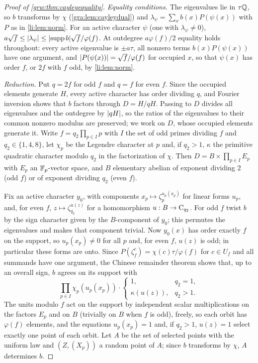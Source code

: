\begin{proof}[Proof of \cref{grw:thm:cayleyequality}]
\emph{Equality conditions.} The eigenvalues lie in $\tau\mathbb{Q}$, so $b$
transforms by $\chi$ (\cref{gra:lem:cayleydual}) and
$\lambda_\psi=\sum_xb(x)P(\psi(x))$ with $P$ as in \cref{li:lem:norm}.
For an active character $\psi$ (one with $\lambda_\psi\ne0$),
$a\sqrt f\le\lvert\lambda_\psi\rvert\le\lvert\operatorname{supp} b\rvert\sqrt f/\varphi(f)$. At
outdegree $a\varphi(f)/2$ equality holds throughout: every active
eigenvalue is $\pm a\tau$, all nonzero terms $b(x)P(\psi(x))$ have one
argument, and $\lvert P(\psi(x))\rvert=\sqrt f/\varphi(f)$ for occupied $x$,
so that $\psi(x)$ has order $f$, or $2f$ with $f$ odd, by
\cref{li:lem:norm}.

\emph{Reduction.} Put $q=2f$ for odd $f$ and $q=f$ for even $f$. Since
the occupied elements generate $H$, every active character has order
dividing $q$, and Fourier inversion shows that $b$ factors through
$D=H/qH$. Passing to $D$ divides all eigenvalues and the outdegree by
$\lvert qH\rvert$, so the ratios of the eigenvalues to their common nonzero
modulus are preserved; we work on $D$, whose occupied elements generate
it. Write $f=q_2\prod_{p\in I}p$ with $I$ the set of odd primes dividing
$f$ and $q_2\in\{1,4,8\}$, let $\chi_p$ be the Legendre character at $p$
and, if $q_2>1$, $\kappa$ the primitive quadratic character modulo $q_2$
in the factorization of $\chi$. Then $D=B\times\prod_{p\in I}E_p$ with
$E_p$ an $\mathbb{F}_p$-vector space, and $B$ elementary abelian of exponent
dividing $2$ (odd $f$) or of exponent dividing $q_2$ (even $f$).

Fix an active character $y_0$, with components $x_p\mapsto
\zeta_p^{u_p(x_p)}$ for linear forms $u_p$, and, for even $f$,
$z\mapsto\zeta_{q_2}^{u(z)}$ for a homomorphism $u:B\to\mathrm{C}_{q_2}$.
For odd $f$ twist $b$ by the sign character given by the $B$-component
of $y_0$; this permutes the eigenvalues and makes that component trivial.
Now $y_0(x)$ has order exactly $f$ on the support, so $u_p(x_p)\ne0$ for
all $p$ and, for even $f$, $u(z)$ is odd; in particular these forms are
onto. Since $P(\zeta_f^c)=\chi(c)\tau/\varphi(f)$ for $c\in U_f$ and all
summands have one argument, the Chinese remainder theorem shows that, up
to an overall sign, $b$ agrees on its support with
\begin{equation}\label{grw:eq:cayleysign}
 \prod_{p\in I}\chi_p(u_p(x_p))\cdot\begin{cases}1,&q_2=1,\\ \kappa(u(z)),&q_2>1.\end{cases}
\end{equation}
The units modulo $f$ act on the support by independent scalar
multiplications on the factors $E_p$ and on $B$ (trivially on $B$ when
$f$ is odd), freely, so each orbit has $\varphi(f)$ elements, and the
equations $u_p(x_p)=1$ and, if $q_2>1$, $u(z)=1$ select exactly one point
of each orbit. Let $A$ be the set of selected points with the uniform law
and $(Z,(X_p))$ a random point of $A$; since $b$ transforms by $\chi$,
$A$ determines $b$.


\end{proof}
